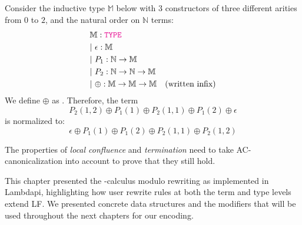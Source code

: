 \begin{example}
Consider the inductive type $\mathbb{M}$ below with 3 constructors of three different arities from $0$ to $2$, and the natural order on $\mathbb{N}$ terms:
\begin{align*}
&\bb{M}: \type \\
&|~\epsilon : \bb{M} \\
&|~P_1: \N \ra \bb{M} \\
&|~P_2 : \N \ra \N \ra \bb{M} \\
&|~ \oplus : \bb{M} \to \bb{M} \to \bb{M} \quad \text{(written infix)}
\end{align*}
We define $\oplus$ as . Therefore, the term
\[
  P_2(1,2) \oplus P_1(1) \oplus P_2(1,1) \oplus P_1(2) \oplus \epsilon
\]
is normalized to:
\[
  \epsilon \oplus P_1(1) \oplus P_1(2) \oplus P_2(1,1) \oplus P_2(1,2)
\]
\end{example}

\begin{remark}
The properties of \emph{local confluence} and \emph{termination} need to take AC-canonicalization into account to prove that they still hold.
\end{remark}


This chapter presented the \lp{}-calculus modulo rewriting as implemented in Lambdapi, highlighting how user rewrite rules at both the term and type levels extend LF.
We presented concrete data structures and the modifiers that will be used throughout the next chapters for our encoding.